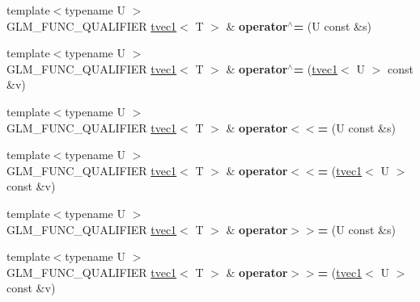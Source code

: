 \begin{DoxyCompactItemize}
\item 
\hypertarget{structglm_1_1detail_1_1tvec1_a3f3f207c7dfdeb1abd780f4c596ea993}{}{\footnotesize template$<$typename U $>$ }\\G\+L\+M\+\_\+\+F\+U\+N\+C\+\_\+\+Q\+U\+A\+L\+I\+F\+I\+E\+R \hyperlink{structglm_1_1detail_1_1tvec1}{tvec1}$<$ T $>$ \& {\bfseries operator$^\wedge$=} (U const \&s)\label{structglm_1_1detail_1_1tvec1_a3f3f207c7dfdeb1abd780f4c596ea993}

\item 
\hypertarget{structglm_1_1detail_1_1tvec1_a66cc9071d4327de86d0e48126280fb52}{}{\footnotesize template$<$typename U $>$ }\\G\+L\+M\+\_\+\+F\+U\+N\+C\+\_\+\+Q\+U\+A\+L\+I\+F\+I\+E\+R \hyperlink{structglm_1_1detail_1_1tvec1}{tvec1}$<$ T $>$ \& {\bfseries operator$^\wedge$=} (\hyperlink{structglm_1_1detail_1_1tvec1}{tvec1}$<$ U $>$ const \&v)\label{structglm_1_1detail_1_1tvec1_a66cc9071d4327de86d0e48126280fb52}

\item 
\hypertarget{structglm_1_1detail_1_1tvec1_af500a6961d21ce10af87656336ff3743}{}{\footnotesize template$<$typename U $>$ }\\G\+L\+M\+\_\+\+F\+U\+N\+C\+\_\+\+Q\+U\+A\+L\+I\+F\+I\+E\+R \hyperlink{structglm_1_1detail_1_1tvec1}{tvec1}$<$ T $>$ \& {\bfseries operator$<$$<$=} (U const \&s)\label{structglm_1_1detail_1_1tvec1_af500a6961d21ce10af87656336ff3743}

\item 
\hypertarget{structglm_1_1detail_1_1tvec1_a6b6425531508763729b32073d0b0c9ab}{}{\footnotesize template$<$typename U $>$ }\\G\+L\+M\+\_\+\+F\+U\+N\+C\+\_\+\+Q\+U\+A\+L\+I\+F\+I\+E\+R \hyperlink{structglm_1_1detail_1_1tvec1}{tvec1}$<$ T $>$ \& {\bfseries operator$<$$<$=} (\hyperlink{structglm_1_1detail_1_1tvec1}{tvec1}$<$ U $>$ const \&v)\label{structglm_1_1detail_1_1tvec1_a6b6425531508763729b32073d0b0c9ab}

\item 
\hypertarget{structglm_1_1detail_1_1tvec1_a348bb1ecfc6b424a4b15b0da58c2a09d}{}{\footnotesize template$<$typename U $>$ }\\G\+L\+M\+\_\+\+F\+U\+N\+C\+\_\+\+Q\+U\+A\+L\+I\+F\+I\+E\+R \hyperlink{structglm_1_1detail_1_1tvec1}{tvec1}$<$ T $>$ \& {\bfseries operator$>$$>$=} (U const \&s)\label{structglm_1_1detail_1_1tvec1_a348bb1ecfc6b424a4b15b0da58c2a09d}

\item 
\hypertarget{structglm_1_1detail_1_1tvec1_a8ece91fd2d7066939275cec489811fcf}{}{\footnotesize template$<$typename U $>$ }\\G\+L\+M\+\_\+\+F\+U\+N\+C\+\_\+\+Q\+U\+A\+L\+I\+F\+I\+E\+R \hyperlink{structglm_1_1detail_1_1tvec1}{tvec1}$<$ T $>$ \& {\bfseries operator$>$$>$=} (\hyperlink{structglm_1_1detail_1_1tvec1}{tvec1}$<$ U $>$ const \&v)\label{structglm_1_1detail_1_1tvec1_a8ece91fd2d7066939275cec489811fcf}

\end{DoxyCompactItemize}
